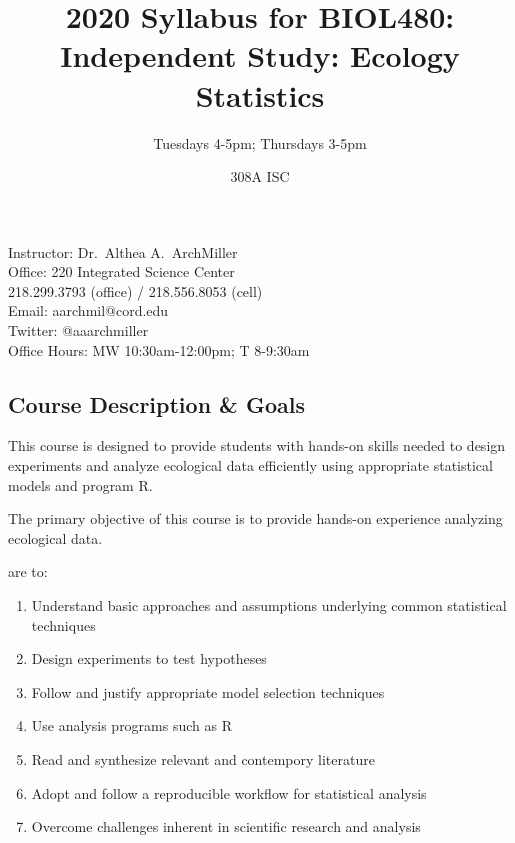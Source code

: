 \documentclass{tufte-handout}
\title{2020 Syllabus for BIOL480: Independent Study: Ecology Statistics}										%
\author{Tuesdays 4-5pm; Thursdays 3-5pm}										%
\date{308A ISC}
\begin{document}
\maketitle

Instructor: Dr.~Althea A.~ArchMiller\\
Office: 220 Integrated Science Center\\
218.299.3793 (office) / 218.556.8053 (cell)\\
Email: aarchmil@cord.edu\\
Twitter: @aaarchmiller\\
Office Hours: MW 10:30am-12:00pm; T 8-9:30am


\begin{fullwidth}

\section{Course Description \& Goals}

This course is designed to provide students with hands-on skills needed to design experiments and analyze ecological data efficiently using appropriate statistical models and program R. 


The primary objective of this course is to provide hands-on experience analyzing ecological data. 

 are to:

\begin{enumerate}
	\item Understand basic approaches and assumptions underlying common statistical techniques
	\item Design experiments to test hypotheses
	\item Follow and justify appropriate model selection techniques
	\item Use analysis programs such as R
	\item Read and synthesize relevant and contempory literature
	\item Adopt and follow a reproducible workflow for statistical analysis
	\item Overcome challenges inherent in scientific research and analysis
\end{enumerate}


\end{fullwidth}
\end{document}
